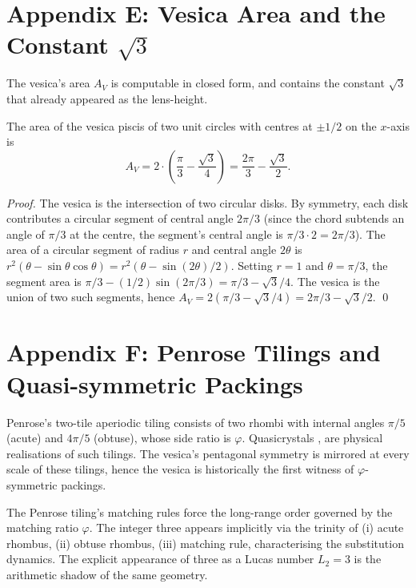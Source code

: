 \section*{Appendix E: Vesica Area and the Constant $\sqrt 3$}
\label{sec:01-app-E}

The vesica's area $A_V$ is computable in closed form, and contains
the constant $\sqrt 3$ that already appeared as the lens-height.

\begin{lemma}\label{lem:01-vesica-area}
The area of the vesica piscis of two unit circles with centres at
$\pm 1/2$ on the $x$-axis is
\[
  A_V = 2 \cdot \left( \frac{\pi}{3} - \frac{\sqrt{3}}{4} \right) =
  \frac{2 \pi}{3} - \frac{\sqrt{3}}{2}.
\]
\end{lemma}

\begin{proof}
The vesica is the intersection of two circular disks. By symmetry,
each disk contributes a circular segment of central angle $2 \pi / 3$
(since the chord subtends an angle of $\pi/3$ at the centre, the
segment's central angle is $\pi/3 \cdot 2 = 2 \pi / 3$). The area of
a circular segment of radius $r$ and central angle $2\theta$ is $r^2
(\theta - \sin\theta \cos\theta) = r^2 (\theta - \sin(2\theta)/2)$.
Setting $r = 1$ and $\theta = \pi/3$, the segment area is $\pi/3 -
(1/2) \sin(2\pi/3) = \pi/3 - \sqrt 3 /4$. The vesica is the union of
two such segments, hence $A_V = 2 (\pi/3 - \sqrt 3/4) = 2\pi/3 -
\sqrt 3 /2$.
\qed
\end{proof}

\section*{Appendix F: Penrose Tilings and Quasi-symmetric Packings}
\label{sec:01-app-F}

Penrose's two-tile aperiodic tiling \cite{penrose1974} consists of
two rhombi with internal angles $\pi/5$ (acute) and $4 \pi /5$
(obtuse), whose side ratio is $\varphi$. Quasicrystals
\cite{shechtman1984}, \cite{senechal_quasicrystals} are physical
realisations of such tilings. The vesica's pentagonal symmetry is
mirrored at every scale of these tilings, hence the vesica is
historically the first witness of $\varphi$-symmetric packings.

\begin{remark}
The Penrose tiling's matching rules force the long-range order
governed by the matching ratio $\varphi$. The integer three appears
implicitly via the trinity of (i) acute rhombus, (ii) obtuse rhombus,
(iii) matching rule, characterising the substitution dynamics. The
explicit appearance of three as a Lucas number $L_2 = 3$ is the
arithmetic shadow of the same geometry.
\end{remark}


